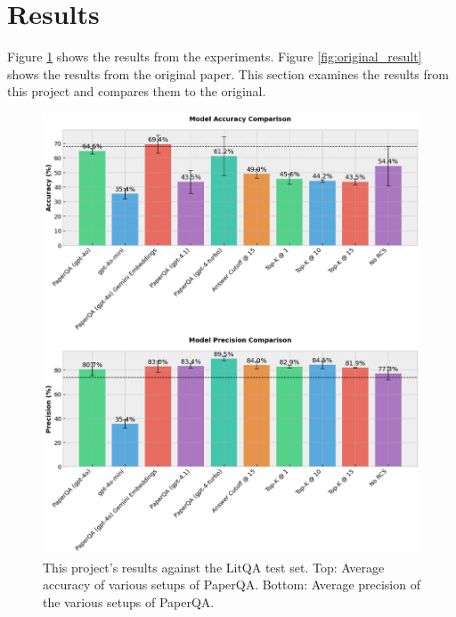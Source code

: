\section{Results}
\label{sec:results}

Figure \ref{fig:main_result} shows the results from the experiments. Figure \ref{fig:original_result} shows the results from the original paper. This section examines the results from this project and compares them to the original. 

\begin{figure}[H]
    \centering
    \includegraphics[width=\textwidth]{figures/main_result.png}
    \caption{This project's results against the LitQA test set. Top: Average accuracy of various setups of PaperQA. Bottom: Average precision of the various setups of PaperQA.}
    \label{fig:main_result}
\end{figure}


